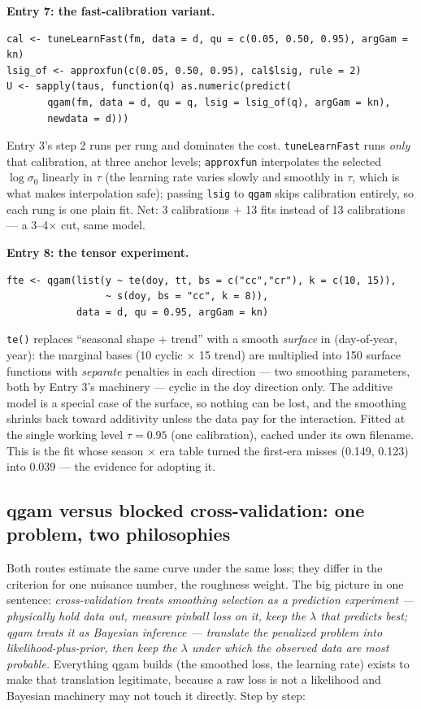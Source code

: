 \documentclass[11pt]{article}
\newcommand{\code}[1]{\texttt{#1}}
\begin{document}
\textbf{Entry 7: the fast-calibration variant.}
\begin{Verbatim}[fontsize=\small]
cal <- tuneLearnFast(fm, data = d, qu = c(0.05, 0.50, 0.95), argGam = kn)
lsig_of <- approxfun(c(0.05, 0.50, 0.95), cal$lsig, rule = 2)
U <- sapply(taus, function(q) as.numeric(predict(
       qgam(fm, data = d, qu = q, lsig = lsig_of(q), argGam = kn),
       newdata = d)))
\end{Verbatim}
Entry 3's step 2 runs per rung and dominates the cost.
\code{tuneLearnFast} runs \emph{only} that calibration, at three anchor
levels; \code{approxfun} interpolates the selected $\log\sigma_0$ linearly
in $\tau$ (the learning rate varies slowly and smoothly in $\tau$, which is
what makes interpolation safe); passing \code{lsig} to \code{qgam} skips
calibration entirely, so each rung is one plain fit. Net: 3 calibrations
$+$ 13 fits instead of 13 calibrations --- a 3--4$\times$ cut, same model.

\textbf{Entry 8: the tensor experiment.}
\begin{Verbatim}[fontsize=\small]
fte <- qgam(list(y ~ te(doy, tt, bs = c("cc","cr"), k = c(10, 15)),
                 ~ s(doy, bs = "cc", k = 8)),
            data = d, qu = 0.95, argGam = kn)
\end{Verbatim}
\code{te()} replaces ``seasonal shape $+$ trend'' with a smooth
\emph{surface} in (day-of-year, year): the marginal bases (10 cyclic
$\times$ 15 trend) are multiplied into 150 surface functions with
\emph{separate} penalties in each direction --- two smoothing parameters,
both by Entry 3's machinery --- cyclic in the doy direction only. The
additive model is a special case of the surface, so nothing can be lost,
and the smoothing shrinks back toward additivity unless the data pay for
the interaction. Fitted at the single working level $\tau = 0.95$ (one
calibration), cached under its own filename. This is the fit whose season
$\times$ era table turned the first-era misses (0.149, 0.123) into 0.039
--- the evidence for adopting it.

\subsection{qgam versus blocked cross-validation: one problem, two philosophies}
\label{sec:qgamvscv}

Both routes estimate the same curve under the same loss; they differ in the
criterion for one nuisance number, the roughness weight. The big picture in
one sentence: \emph{cross-validation treats smoothing selection as a
prediction experiment --- physically hold data out, measure pinball loss on
it, keep the $\lambda$ that predicts best; qgam treats it as Bayesian
inference --- translate the penalized problem into likelihood-plus-prior,
then keep the $\lambda$ under which the observed data are most probable.}
Everything qgam builds (the smoothed loss, the learning rate) exists to
make that translation legitimate, because a raw loss is not a likelihood
and Bayesian machinery may not touch it directly. Step by step:
\end{document}
